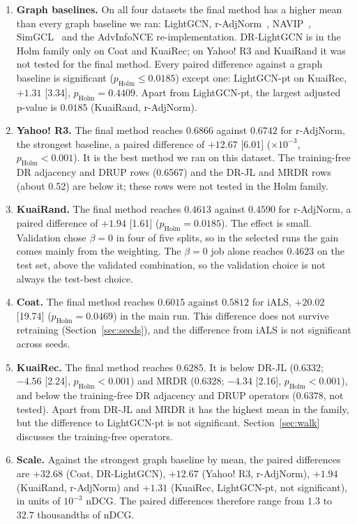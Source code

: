 \begin{enumerate}
\item \textbf{Graph baselines.} On all four datasets the final method has a higher mean than every graph
baseline we ran: LightGCN, r-AdjNorm~\citep{zhao2022radjnorm}, NAVIP~\citep{kim2022navip}, SimGCL~\citep{yu2022simgcl}
and the AdvInfoNCE re-implementation. DR-LightGCN is in the Holm family only on Coat and KuaiRec; on
Yahoo! R3 and KuaiRand it was not tested for the final method. Every paired difference against a graph baseline is
significant ($p_{\text{Holm}}\le0.0185$) except one: LightGCN-pt on KuaiRec, $+1.31$ [3.34], $p_{\text{Holm}}=0.4409$.
Apart from LightGCN-pt, the largest adjusted p-value is $0.0185$ (KuaiRand, r-AdjNorm).
\item \textbf{Yahoo! R3.} The final method reaches $0.6866$ against $0.6742$ for r-AdjNorm, the strongest
baseline, a paired difference of $+12.67$ [6.01] ($\times10^{-3}$, $p_{\text{Holm}}<0.001$). It is the best
method we ran on this dataset. The training-free DR adjacency and DRUP rows (0.6567) and the DR-JL and MRDR
rows (about 0.52) are below it; these rows were not tested in the Holm family.
\item \textbf{KuaiRand.} The final method reaches $0.4613$ against $0.4590$ for r-AdjNorm, a paired difference of
$+1.94$ [1.61] ($p_{\text{Holm}}=0.0185$). The effect is small. Validation chose $\beta=0$ in four of five splits,
so in the selected runs the gain comes mainly from the weighting. The $\beta=0$ job alone reaches $0.4623$ on the test set, above
the validated combination, so the validation choice is not always the test-best choice.
\item \textbf{Coat.} The final method reaches $0.6015$ against $0.5812$ for iALS, $+20.02$ [19.74]
($p_{\text{Holm}}=0.0469$) in the main run. This difference does not survive retraining (Section~\ref{sec:seeds}),
and the difference from iALS is not significant across seeds.
\item \textbf{KuaiRec.} The final method reaches $0.6285$. It is below DR-JL ($0.6332$; $-4.56$ [2.24],
$p_{\text{Holm}}<0.001$) and MRDR ($0.6328$; $-4.34$ [2.16], $p_{\text{Holm}}<0.001$), and below the training-free
DR adjacency and DRUP operators ($0.6378$, not tested). Apart from DR-JL and MRDR it has the highest mean in
the family, but the difference to LightGCN-pt is not significant. Section~\ref{sec:walk} discusses the training-free
operators.
\item \textbf{Scale.} Against the strongest graph baseline by mean, the paired differences are $+32.68$ (Coat,
DR-LightGCN), $+12.67$ (Yahoo! R3, r-AdjNorm), $+1.94$ (KuaiRand, r-AdjNorm) and $+1.31$ (KuaiRec,
LightGCN-pt, not significant), in units of $10^{-3}$ nDCG. The paired differences therefore range from
$1.3$ to $32.7$ thousandths of nDCG.
\end{enumerate}


